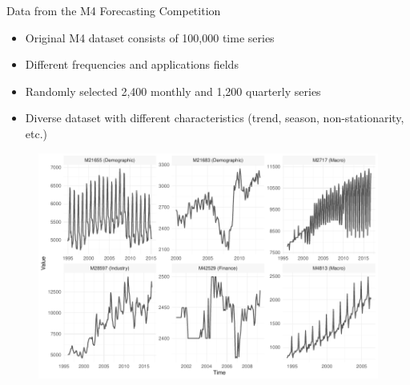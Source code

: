 \documentclass[aspectratio=169]{beamer}
\begin{document}
\begin{frame}[t]{Data from the M4 Forecasting Competition}
    \begin{minipage}[t]{0.3\textwidth}
        \vspace{0pt}
        \begin{itemize}
            \item Original M4 dataset consists of 100,000 time series
			\item Different frequencies and applications fields
			\item Randomly selected 2,400 monthly and 1,200 quarterly series
			\item Diverse dataset with different characteristics (trend, season, non-stationarity, etc.)
        \end{itemize}
    \end{minipage}%
    \hfill
    \begin{minipage}[t]{0.7\textwidth}
        \vspace{0pt}
 		\begin{figure}[H]
		\center
			\includegraphics[scale=0.7]{figures/figure_03_data_sample_wide.pdf}
		\end{figure}
    \end{minipage}
\end{frame}
\end{document}
